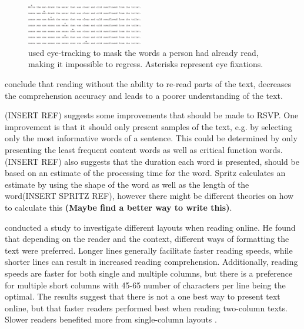 \begin{figure}[htbp]
\centering
\includegraphics[width=0.45\textwidth]{Pics/trace_crosses}
\caption{\protect\citeauthor{schotter_dont_2014} used eye-tracking to mask the words a person had already read, making it impossible to regress. Asterisks represent eye fixations.}
\label{fig:trace_cross}
\end{figure}

\citeauthor{schotter_dont_2014} conclude that reading without the ability to re-read parts of the text, decreases the comprehension accuracy and leads to a poorer understanding of the text.


(INSERT REF) suggests some improvements that should be made to RSVP. One improvement is that it should only present samples of the text, e.g. by selecting only the most informative words of a sentence. This could be determined by only presenting the least frequent content words as well as critical function words. (INSERT REF) also suggests that the duration each word is presented, should be based on an estimate of the processing time for the word. Spritz calculates an estimate by using the shape of the word as well as the length of the word(INSERT SPRITZ REF), however there might be different theories on how to calculate this \textbf{(Maybe find a better way to write this)}.

 conducted a study to investigate different layouts when reading online. He found that depending on the reader and the context, different ways of formatting the text were preferred. Longer lines generally facilitate faster reading speeds, while shorter lines can result in increased reading comprehension. Additionally, reading speeds are faster for both single and multiple columns, but there is a preference for multiple short columns with 45-65 number of characters per line being the optimal. The results suggest that there is not a one best way to present text online, but that faster readers performed best when reading two-column texts. Slower readers benefited more from single-column layouts \cite{baker_is_2005}.